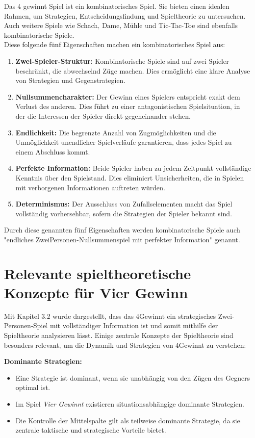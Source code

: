 Das 4 gewinnt Spiel ist ein kombinatorisches Spiel. Sie bieten einen idealen Rahmen, um Strategien, Entscheidungsfindung und Spieltheorie zu untersuchen. Auch weitere Spiele wie Schach, Dame, Mühle und Tic-Tac-Toe sind ebenfalls kombinatorische Spiele. \\
Diese folgende fünf Eigenschaften machen ein kombinatorisches Spiel aus:
\begin{enumerate}
	\item   \textbf{Zwei-Spieler-Struktur: }Kombinatorische Spiele sind auf zwei Spieler beschränkt, die abwechselnd Züge machen. Dies ermöglicht eine klare Analyse von Strategien und Gegenstrategien.
	\item 	\textbf{Nullsummencharakter: }Der Gewinn eines Spielers entspricht exakt dem Verlust des anderen. Dies führt zu einer antagonistischen Spielsituation, in der die Interessen der Spieler direkt gegeneinander stehen.
	\item 	\textbf{Endlichkeit: }Die begrenzte Anzahl von Zugmöglichkeiten und die Unmöglichkeit unendlicher Spielverläufe garantieren, dass jedes Spiel zu einem Abschluss kommt.
	\item 	\textbf{Perfekte Information: }Beide Spieler haben zu jedem Zeitpunkt vollständige Kenntnis über den Spielstand. Dies eliminiert Unsicherheiten, die in Spielen mit verborgenen Informationen auftreten würden.
	\item 	\textbf{Determinismus:} Der Ausschluss von Zufallselementen macht das Spiel vollständig vorhersehbar, sofern die Strategien der Spieler bekannt sind.
\end{enumerate}

Durch diese genannten fünf Eigenschaften werden kombinatorische Spiele auch "endliches ZweiPersonen-Nullsummenspiel mit perfekter Information" genannt.

\section{Relevante spieltheoretische Konzepte für Vier Gewinn}
Mit Kapitel 3.2 wurde dargestellt, dass das 4Gewinnt ein strategisches Zwei-Personen-Spiel mit vollständiger Information ist und somit mithilfe der Spieltheorie analysieren lässt. Einige zentrale Konzepte der Spieltheorie sind besonders relevant, um die Dynamik und Strategien von 4Gewinnt zu verstehen:


\textbf{Dominante Strategien:}
\begin{itemize}
	\item Eine Strategie ist dominant, wenn sie unabhängig von den Zügen des Gegners optimal ist.
	\item Im Spiel \textit{Vier Gewinnt} existieren situationsabhängige dominante Strategien.
	\item Die Kontrolle der Mittelspalte gilt als teilweise dominante Strategie, da sie zentrale taktische und strategische Vorteile bietet.
\end{itemize}

